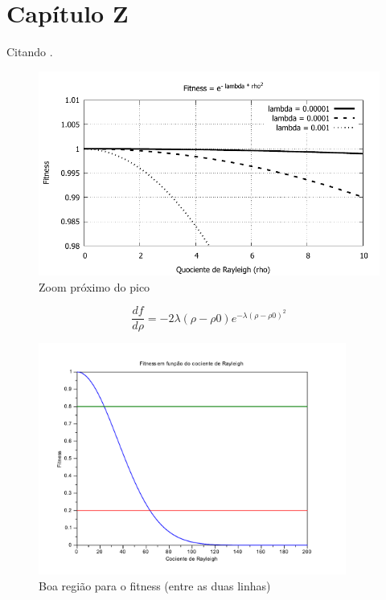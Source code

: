 \chapter{Capítulo Z}
\label{cap:capZ}
	
	Citando \cite{Coope1977}.
	
	\begin{figure}[htbp]
		\centering
			\includegraphics{figs/varios-fit-mono-zoom.pdf}
		\caption{Zoom próximo do pico}
		\label{fig:varios-fit-mono-zoom}
	\end{figure}
	
		
	$$
		\frac{df}{d\rho} = -2\lambda(\rho - \rho0)e^{-\lambda(\rho - \rho0)^2}
	$$
	
		
	\begin{figure}[htbp]
		\centering
			\includegraphics[width=0.90\textwidth]{figs/resultados/fitness_boaRegiao.pdf}
		\caption{Boa região para o fitness (entre as duas linhas)}
		\label{fig:fitness_boaRegiao}
	\end{figure}
	

